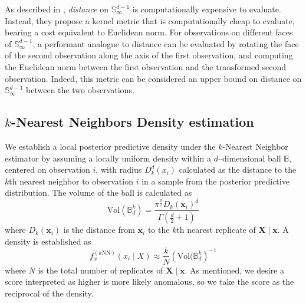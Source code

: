 As described in \cite{trubey:pg}, \emph{distance} on $\mathbb{S}_{\infty}^{d-1}$ 
    is computationally expensive to evaluate.  Instead, they propose a kernel
    metric that is computationally cheap to evaluate, bearing a cost
    equivalent to Euclidean norm.  For observations on different faces of 
    $\mathbb{S}_{\infty}^{d-1}$, a performant analogue to distance can be
    evaluated by rotating the face of the second observation along the axis of
    the first observation, and computing the Euclidean norm between the first
    observation and the transformed second observation.  Indeed, this metric can
    be considered an upper bound on distance on $\mathbb{S}_{\infty}^{d-1}$
    between the two observations.



\subsection{$k$-Nearest Neighbors Density estimation}
We establish a local posterior predictive density under the $k$-Nearest Neighbor 
    estimator \citep{mack1979} by assuming a locally uniform density within a 
    $d$--dimensional ball $\mathbb{B}$, centered on observation $i$, with 
    radius $D_{k}^d(x_i)$ calculated as the distance to the $k$th nearest 
    neighbor to observation $i$ in a sample from the posterior predictive 
    distribution. The volume of the ball is calculated as
    \begin{equation}
        \label{eq:vol_sphere}
        \text{Vol}(\mathbb{B}_d^k) =
        \frac{\pi^{\frac{d}{2}}D_{k}(\bm{x}_i)^d}{
            \Gamma\left(\frac{d}{2} + 1\right)}
    \end{equation}
    where $D_k(\bm{x}_i)$ is the distance from $\bm{x}_i$ to the $k$th nearest 
    replicate of $\bm{X}\mid\bm{x}$.  A density is established as 
    \begin{equation}
        \label{eq:ad_knn}
        f_{x}^{(k\text{NN})}(x_i\mid X) \approx 
            \frac{k}{N}\left(\text{Vol}(\mathbb{B}_d^k\right)^{-1}
    \end{equation}
    where $N$ is the total number of replicates of $\bm{X}\mid\bm{x}$.  As 
    mentioned, we desire a score interpreted as higher is more likely anomalous, 
    so we take the score as the reciprocal of the density.

